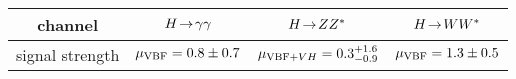 \begin{tabular}{c|c|c|c}
  channel         & $H \!\rightarrow\! \gamma\gamma$                 & $H \!\rightarrow\! ZZ^\ast$                         & $H \!\rightarrow\! WW^\ast$ \\
  \hline
  signal strength & $\mu_{\text{VBF}} = 0.8 \pm 0.7$ & $\mu_{\text{VBF}+VH} = 0.3^{+1.6}_{-0.9}$ & $\mu_{\text{VBF}} = 1.3 \pm 0.5$ \\
\end{tabular}
